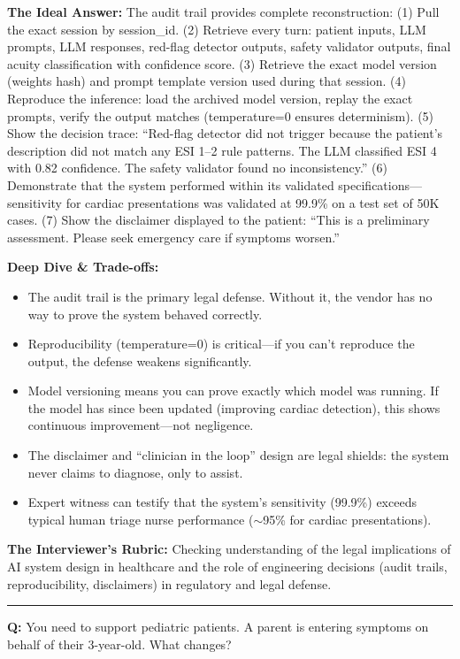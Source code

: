 \textbf{The Ideal Answer:} The audit trail provides complete reconstruction: (1) Pull the exact session by session\_id. (2) Retrieve every turn: patient inputs, LLM prompts, LLM responses, red-flag detector outputs, safety validator outputs, final acuity classification with confidence score. (3) Retrieve the exact model version (weights hash) and prompt template version used during that session. (4) Reproduce the inference: load the archived model version, replay the exact prompts, verify the output matches (temperature=0 ensures determinism). (5) Show the decision trace: ``Red-flag detector did not trigger because the patient's description did not match any ESI 1--2 rule patterns. The LLM classified ESI 4 with 0.82 confidence. The safety validator found no inconsistency.'' (6) Demonstrate that the system performed within its validated specifications---sensitivity for cardiac presentations was validated at 99.9\% on a test set of 50K cases. (7) Show the disclaimer displayed to the patient: ``This is a preliminary assessment. Please seek emergency care if symptoms worsen.''

\textbf{Deep Dive \& Trade-offs:}
\begin{itemize}
  \item The audit trail is the primary legal defense. Without it, the vendor has no way to prove the system behaved correctly.
  \item Reproducibility (temperature=0) is critical---if you can't reproduce the output, the defense weakens significantly.
  \item Model versioning means you can prove exactly which model was running. If the model has since been updated (improving cardiac detection), this shows continuous improvement---not negligence.
  \item The disclaimer and ``clinician in the loop'' design are legal shields: the system never claims to diagnose, only to assist.
  \item Expert witness can testify that the system's sensitivity (99.9\%) exceeds typical human triage nurse performance ($\sim$95\% for cardiac presentations).
\end{itemize}

\textbf{The Interviewer's Rubric:} Checking understanding of the legal implications of AI system design in healthcare and the role of engineering decisions (audit trails, reproducibility, disclaimers) in regulatory and legal defense.

\bigskip\hrule\bigskip

\textbf{Q:} You need to support pediatric patients. A parent is entering symptoms on behalf of their 3-year-old. What changes?

